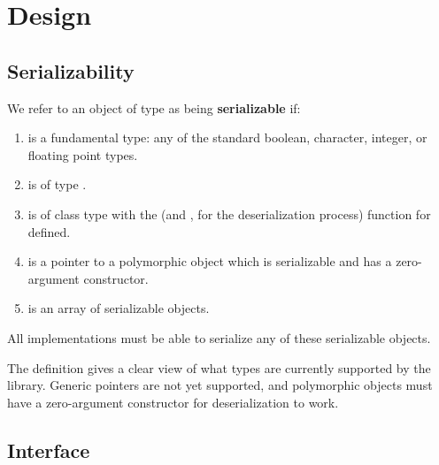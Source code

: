 \documentclass{article}
\begin{document}
\section{Design}

\subsection{Serializability}
We refer to an object of type  as being \textbf{serializable} if:
\begin{enumerate}
\item {} is a fundamental type: any of the standard
  boolean, character, integer, or floating point types.
\item {} is of type .
\item {} is of class type with the  (and
  , for the deserialization process) function for
   defined.
\item {} is a pointer to a polymorphic object which is
  serializable and has a zero-argument constructor.
\item {} is an array of serializable objects.
\end{enumerate}

All implementations must be able to serialize any of these
serializable objects.

The definition gives a clear view of what types are currently
supported by the library. Generic pointers are not yet supported, and
polymorphic objects must have a zero-argument constructor for
deserialization to work.

\subsection{Interface}

\begin{description}
\item {}
\item {}
\end{description}

\begin{description}
\item {}
\item {}
\end{description}
\eoclass
\end{document}
